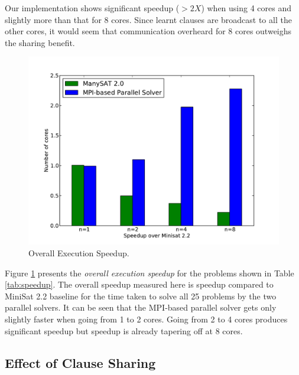 \documentclass[letterpaper, compsoc, conference]{IEEEtran}
\begin{document}
Our implementation shows significant speedup ($>2X$) when using 4 cores and
slightly more than that for 8 cores. Since learnt clauses are broadcast
to all the other cores, it would seem that communication overheard for 8
cores outweighs the sharing benefit.

\begin{figure}[htbp]
    \begin{center}
        \includegraphics[width=\columnwidth]{images/speedup1.pdf}
        \caption{Overall Execution Speedup.}
        \label{fig:speedup}
    \end{center}
\end{figure}

Figure \ref{fig:speedup} presents the \emph{overall execution speedup} for the
problems shown in Table \ref{tab:speedup}. The overall speedup measured here is
speedup compared to MiniSat 2.2 baseline for the time taken to solve all 25
problems by the two parallel solvers. It can be seen that the MPI-based
parallel solver gets only slightly faster when going from 1 to 2 cores. Going
from 2 to 4 cores produces significant speedup but speedup is already tapering
off at 8 cores.

\subsection{Effect of Clause Sharing}
\label{sec:sharing effects}
\end{document}
